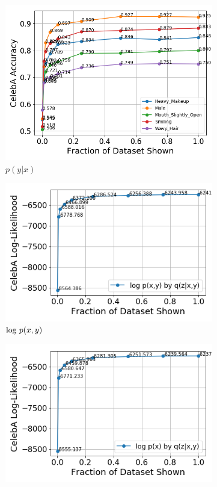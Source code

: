 \begin{figure}[h!]
\centering
    \begin{subfigure}[b]{.24\linewidth}
        \includegraphics[width=\linewidth]{images/chapter3/weaksup/celeba19random}
        \caption{$p(y|x)$}
    \end{subfigure}
    \begin{subfigure}[b]{.24\linewidth}
        \includegraphics[width=\linewidth]{images/chapter3/weaksup/celeba19joint}
        \caption{$\textup{log }p(x,y)$}
    \end{subfigure}
    \begin{subfigure}[b]{.24\linewidth}
        \includegraphics[width=\linewidth]{images/chapter3/weaksup/celeba19marginal}

\end{subfigure}
\end{figure}
